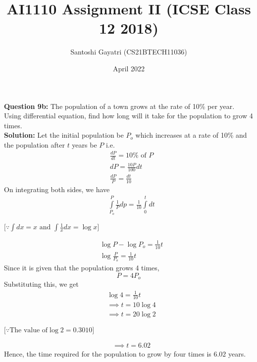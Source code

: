 \documentclass[journal,12pt,twocolumn]{IEEEtran}
\title{AI1110 Assignment II (ICSE Class 12 2018)}
\author{Santoshi Gayatri (CS21BTECH11036)}
\date{April 2022}
\begin{document}
\maketitle
\textbf {Question 9b:}
The population of a town grows at the rate of 10\% per year. Using differential equation, find how long will it take for the population to grow 4 times.\\

\textbf{Solution:}
Let the initial population be $P_o$ which increases at a rate of 10\% and the population after $t$ years be $P$ i.e.
\begin{align}
& {\displaystyle \frac{dP}{dt} = 10\% \mbox{ of } P}\\[6pt]
& {dP =\displaystyle \frac{10P}{100}dt }\\[10pt]
& {\displaystyle \frac{dP}{P} = \frac{dt}{10}}
\end{align}
On integrating both sides, we have 
\begin{align}
& {\displaystyle { \int\limits_{P_o}^{P} \frac{1}{P} dp = \frac {1}{10} \int\limits_{0}^{t}dt}}
\end{align}
\begin{center}
$ \Big [\because \int dx = x  \mbox{ and } \displaystyle{\int\displaystyle \frac{1}{x}dx} = \log x  \Big ] $
\end{center}
\begin{align}
& {\log P - \log P_o = \frac{1}{10}t }\\
&{ \log \frac{P}{P_o} = \frac{1}{10}t }
\end{align}
Since it is given that the population grows 4 times, $${P = 4P_o}$$
Substituting this, we get
\begin{align}
& {\log 4 =\displaystyle \frac {1}{10}t}\\[8pt]
& {\implies t= 10 \log 4 }\\[8pt]
& {\implies t = 20\log 2 }
\end{align}
\begin{center}
$ \Big[\because \mbox {The value of} \log 2 = 0.3010\Big] $\\
\end{center}
\begin{align}
& {\implies t = 6.02} 
\end{align}
Hence, the time required for the population to grow by four times is $6.02$ years.
\end{document}
